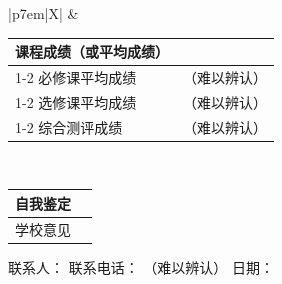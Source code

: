 \documentclass[UTF8,10pt,a4paper,fontset=fandol]{ctexart}
\newcommand{\fieldvalue}[1]{#1}
\newcommand{\handwritten}[1]{#1}
\begin{document}
\vspace{0.3em}

\begin{tabularx}{\textwidth}{|p{7em}|X|}
\hline
{}
&
{\begin{tabularx}{\linewidth}{@{}p{11em}|X@{}}
课程成绩（或平均成绩） & \\
\cline{1-2}
必修课平均成绩 &
\fieldvalue{\handwritten{（难以辨认）}} \\
\cline{1-2}
选修课平均成绩 &
\fieldvalue{\handwritten{（难以辨认）}} \\
\cline{1-2}
综合测评成绩 &
\fieldvalue{\handwritten{（难以辨认）}} \\
\end{tabularx}}
\\ \hline
\end{tabularx}

\vspace{0.3em}

\begin{tabularx}{\textwidth}{|p{7em}|X|}
\hline
自我鉴定 &
\rule{0pt}{5em} \\ \hline
学校意见 &
\rule{0pt}{4em} \\ \hline
\end{tabularx}

\vspace{0.35em}

\noindent
联系人：\underline{\hspace{8em}}
\qquad
联系电话：
\fieldvalue{\handwritten{（难以辨认）}}
\qquad
日期：\underline{\hspace{7em}}



\newpage

\end{document}
